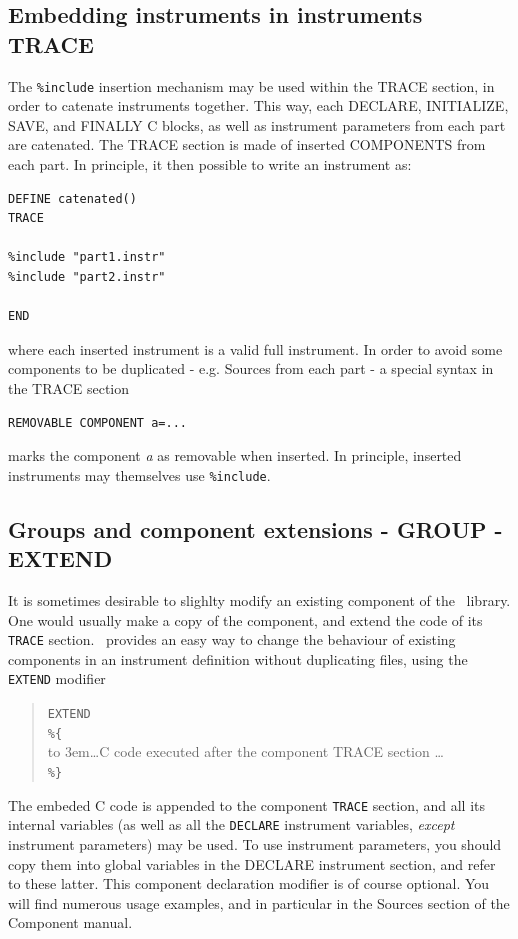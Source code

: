 \subsection{Embedding instruments in instruments TRACE}
\label{s:instrdefs-include-instr}
The \texttt{\%include} insertion mechanism may be used within the TRACE section, in order to catenate instruments together. This way, each DECLARE, INITIALIZE, SAVE, and FINALLY C blocks, as well as instrument parameters from each part are catenated. The TRACE section is made of inserted COMPONENTS from each part. In principle, it then possible to write an instrument as:
\begin{verbatim}
DEFINE catenated()
TRACE

%include "part1.instr"
%include "part2.instr"

END
\end{verbatim}
where each inserted instrument is a valid full instrument. In order to avoid some components to be duplicated - e.g. Sources from each part - a special syntax in the TRACE section
\begin{verbatim}
REMOVABLE COMPONENT a=...
\end{verbatim}
marks the component {\it a} as removable when inserted. In principle, inserted instruments may themselves use \texttt{\%include}.

\subsection{Groups and component extensions - GROUP - EXTEND}
\label{s:instrdefs-extend-group}

It is sometimes desirable to slighlty modify an existing component of the \MCS\ library. One would usually make a copy of the component, and extend the code of its \texttt{TRACE} section. \MCS\ provides an easy way to change the behaviour of existing components in an instrument definition without duplicating files, using the \texttt{EXTEND} modifier 
\begin{quote}
  \texttt{EXTEND} \\
  \verb|%{| \\
  \hbox to 3em{}\ldots C code executed after the component TRACE section \ldots \\
  \verb|%}|
\end{quote} 
The embeded C code is appended to the component \texttt{TRACE} section, and all its internal variables (as well as all the \texttt{DECLARE} instrument variables, \emph{except} instrument parameters) may be used. To use instrument parameters, you should copy them into global variables in the DECLARE instrument section, and refer to these latter.
This component declaration modifier is of course optional. You will find numerous usage examples, and in particular in the Sources section of the Component manual.

